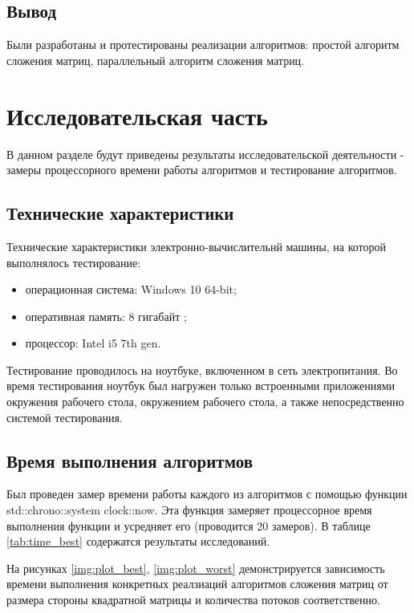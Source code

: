 \subsection{Вывод}

Были разработаны и протестированы реализации алгоритмов: простой алгоритм сложения матриц, параллельный алгоритм сложения матриц.

\section{Исследовательская часть}
В данном разделе будут приведены результаты исследовательской деятельности - замеры процессорного времени работы алгоритмов и тестирование алгоритмов.

\subsection{Технические характеристики}

Технические характеристики электронно-вычислительнй машины, на которой выполнялось тестирование:

\begin{itemize}
    \item операционная система: Windows 10 64-bit;
    \item оперативная память: 8 гигабайт ;
    \item процессор: Intel i5 7th gen.
\end{itemize}


Тестирование проводилось на ноутбуке, включенном в сеть электропитания. Во время тестирования ноутбук был нагружен только встроенными приложениями окружения рабочего стола, окружением рабочего стола, а также непосредственно системой тестирования.

\subsection{Время выполнения алгоритмов}

Был проведен замер времени работы каждого из алгоритмов с помощью функции std::chrono::system clock::now. Эта функция замеряет процессорное время выполнения функции и усредняет его (проводится 20 замеров). В таблице \ref{tab:time_best} содержатся результаты исследований.

На рисунках \ref{img:plot_best}, \ref{img:plot_worst} демонстрируется зависимость времени выполнения конкретных реалзиаций алгоритмов сложения матриц от размера стороны квадратной матрицы и количества потоков соответственно. \\

